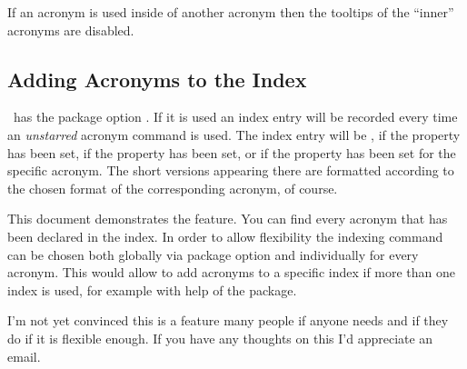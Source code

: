 \documentclass{acro-manual}
\begin{document}
If an acronym is used inside of another acronym then the tooltips of the
``inner'' acronyms are disabled.

\subsection{Adding Acronyms to the Index}\label{ssec:index}
\acro\ has the package option .  If it is used an index entry
will be recorded every time an \emph{unstarred} acronym command is used.  The
index entry will be ,
 if the  property has been set,
 if the property 
has been set, or  if the property  has been set
for the specific acronym.  The short versions appearing there are formatted
according to the chosen format of the corresponding acronym, of course.

This document demonstrates the feature.  You can find every acronym that has
been declared in the index.  In order to allow flexibility the indexing
command can be chosen both globally via package option and individually for
every acronym.  This would allow to add acronyms to a specific index if more
than one index is used, for example with help of the  package.

I'm not yet convinced this is a feature many people if anyone needs and if
they do if it is flexible enough.  If you have any thoughts on this I'd
appreciate an email.
\end{document}
